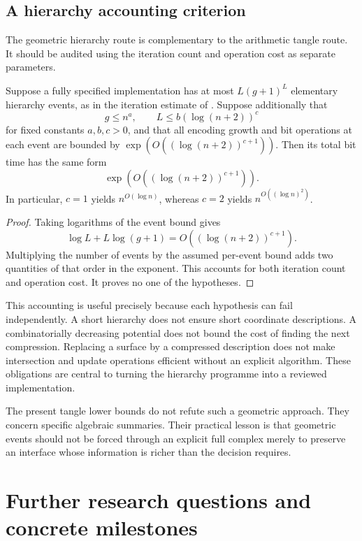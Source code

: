 \subsection{A hierarchy accounting criterion}

The geometric hierarchy route is complementary to the arithmetic tangle
route. It should be audited using the iteration count and operation cost
as separate parameters.

\begin{proposition}
\label{prop:hierarchy-accounting}
Suppose a fully specified implementation has at most \(L(g+1)^L\)
elementary hierarchy events, as in the iteration estimate of
\cite[Proposition~9.1]{lackenby-2026}. Suppose additionally that
\[
 g\le n^a,\qquad L\le b(\log(n+2))^c
\]
for fixed constants \(a,b,c>0\), and that all encoding growth and
bit operations at each event are bounded by
\(\exp(O((\log(n+2))^{c+1}))\).
Then its total bit time has the same form
\[
 \exp(O((\log(n+2))^{c+1})).
\]
In particular, \(c=1\) yields \(n^{O(\log n)}\), whereas \(c=2\)
yields \(n^{O((\log n)^2)}\).
\end{proposition}

\begin{proof}
Taking logarithms of the event bound gives
\[
 \log L+L\log(g+1)
 =O((\log(n+2))^{c+1}).
\]
Multiplying the number of events by the assumed per-event bound adds
two quantities of that order in the exponent. This accounts for both
iteration count and operation cost. It proves no one of the hypotheses.
\end{proof}

This accounting is useful precisely because each hypothesis can fail
independently. A short hierarchy does not ensure short coordinate
descriptions. A combinatorially decreasing potential does not bound the
cost of finding the next compression. Replacing a surface by a compressed
description does not make intersection and update operations efficient
without an explicit algorithm. These obligations are central to turning
the hierarchy programme into a reviewed implementation.

The present tangle lower bounds do not refute such a geometric approach.
They concern specific algebraic summaries. Their practical lesson is
that geometric events should not be forced through an explicit full
complex merely to preserve an interface whose information is richer
than the decision requires.

\section{Further research questions and concrete milestones}
\label{sec:questions}

